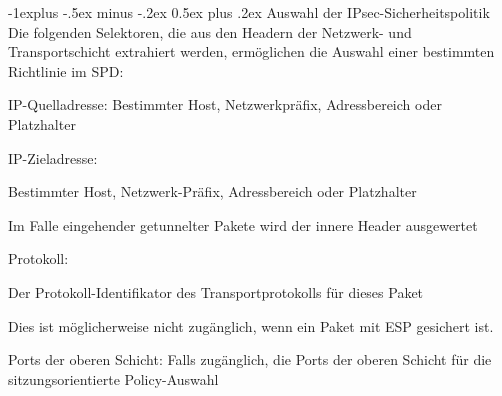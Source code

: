 \documentclass[a4paper]{article}
\makeatletter
\renewcommand{\subsection}{\@startsection{subsection}{2}{0mm}%
 {-1explus -.5ex minus -.2ex}%
 {0.5ex plus .2ex}%
 {\normalfont\normalsize\bfseries}}
\makeatother
\begin{document}
\begin{multicols}{3}
      \subsection{Auswahl der IPsec-Sicherheitspolitik}
      Die folgenden Selektoren, die aus den Headern der Netzwerk- und Transportschicht extrahiert werden, ermöglichen die Auswahl einer bestimmten Richtlinie im SPD:
      \begin{itemize*}
            \item IP-Quelladresse: Bestimmter Host, Netzwerkpräfix, Adressbereich oder Platzhalter
            \item IP-Zieladresse:
            \begin{itemize*}
                  \item Bestimmter Host, Netzwerk-Präfix, Adressbereich oder Platzhalter
                  \item Im Falle eingehender getunnelter Pakete wird der innere Header ausgewertet
            \end{itemize*}
            \item Protokoll:
            \begin{itemize*}
                  \item Der Protokoll-Identifikator des Transportprotokolls für dieses Paket
                  \item Dies ist möglicherweise nicht zugänglich, wenn ein Paket mit ESP gesichert ist.
            \end{itemize*}
            \item Ports der oberen Schicht: Falls zugänglich, die Ports der oberen Schicht für die sitzungsorientierte Policy-Auswahl
      \end{itemize*}


\end{multicols}
\end{document}
